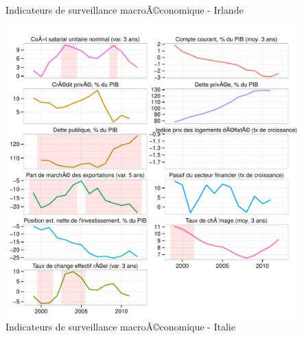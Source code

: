 \documentclass{article}\usepackage[]{graphicx}\usepackage[]{color}
\makeatletter
\def\maxwidth{ %
  \ifdim\Gin@nat@width>\linewidth
    \linewidth
  \else
    \Gin@nat@width
  \fi
}
\newenvironment{knitrout}{}{} %
\makeatother
\begin{document}
\begin{knitrout}
\begin{figure}[p]
{}

\caption[Indicateurs de surveillance macroÃ©conomique - Irlande]{Indicateurs de surveillance macroÃ©conomique - Irlande\label{fig:byco15}}
\end{figure}

\begin{figure}[p]


{\centering \includegraphics[width=\maxwidth]{figure_graph/byco16} 

}

\caption[Indicateurs de surveillance macroÃ©conomique - Italie]{Indicateurs de surveillance macroÃ©conomique - Italie\label{fig:byco16}}
\end{figure}

\begin{figure}[p]



\end{figure}
\end{knitrout}
\end{document}
